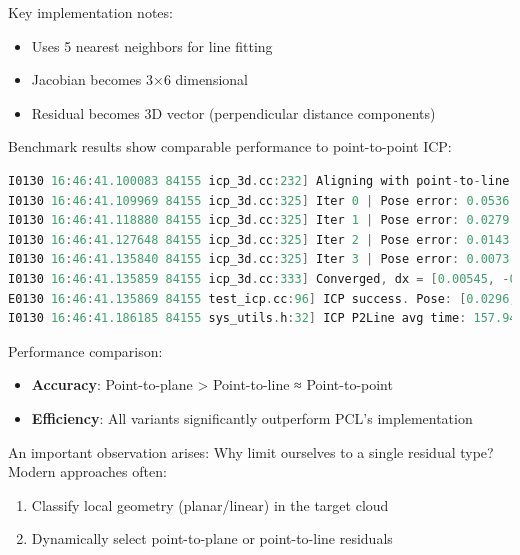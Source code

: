 Key implementation notes:
\begin{itemize}
	\item Uses 5 nearest neighbors for line fitting
	\linebreak[1] \item Jacobian becomes 3×6 dimensional
	\linebreak[1] \item Residual becomes 3D vector (perpendicular distance components)
\end{itemize}

Benchmark results show comparable performance to point-to-point ICP:

\begin{lstlisting}[language=c++,caption=Terminal output]
I0130 16:46:41.100083 84155 icp_3d.cc:232] Aligning with point-to-line
I0130 16:46:41.109969 84155 icp_3d.cc:325] Iter 0 | Pose error: 0.0536 | Res: 11.360 | Eff: 44503 | Avg: 0.000255 | dx: 0.0431
I0130 16:46:41.118880 84155 icp_3d.cc:325] Iter 1 | Pose error: 0.0279 | Res: 3.6516 | Eff: 44515 | Avg: 8.20e-05 | dx: 0.0262
I0130 16:46:41.127648 84155 icp_3d.cc:325] Iter 2 | Pose error: 0.0143 | Res: 1.013 | Eff: 44515 | Avg: 2.28e-05 | dx: 0.0138
I0130 16:46:41.135840 84155 icp_3d.cc:325] Iter 3 | Pose error: 0.0073 | Res: 0.292 | Eff: 44515 | Avg: 6.58e-06 | dx: 0.00714
I0130 16:46:41.135859 84155 icp_3d.cc:333] Converged, dx = [0.00545, -0.00273, -0.00242, -0.000307, 0.00164, -0.00229]
E0130 16:46:41.135869 84155 test_icp.cc:96] ICP success. Pose: [0.0296, -0.0118, -0.0257, 0.999], [-0.0702, -0.1019, 0.00249]
I0130 16:46:41.186185 84155 sys_utils.h:32] ICP P2Line avg time: 157.942ms (1 runs)
\end{lstlisting}

Performance comparison:
\begin{itemize}
	\item \textbf{Accuracy}: Point-to-plane > Point-to-line ≈ Point-to-point
	\item \textbf{Efficiency}: All variants significantly outperform PCL's implementation
\end{itemize}

An important observation arises: Why limit ourselves to a single residual type? Modern approaches often:
\begin{enumerate}
	\item Classify local geometry (planar/linear) in the target cloud
	\item Dynamically select point-to-plane or point-to-line residuals
\end{enumerate}

